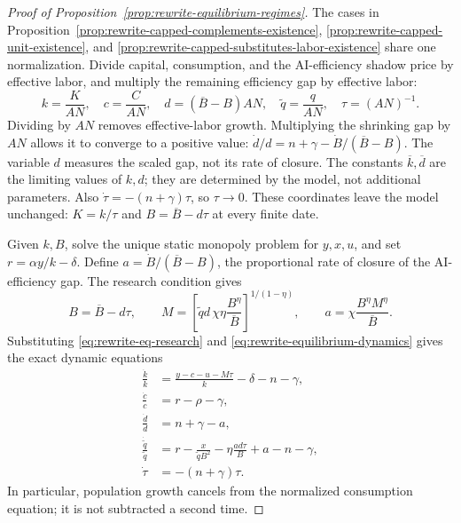 \begin{proof}[Proof of Proposition~\ref{prop:rewrite-equilibrium-regimes}]
The cases in Proposition~\ref{prop:rewrite-capped-complements-existence},
\ref{prop:rewrite-capped-unit-existence}, and
\ref{prop:rewrite-capped-substitutes-labor-existence} share one
normalization. Divide capital, consumption, and the AI-efficiency shadow
price by effective labor, and multiply the remaining efficiency gap by
effective labor:
\begin{equation}
 k=\frac K{AN},\quad c=\frac C{AN},\quad
 d=(\overline B-B)AN,\quad \widetilde q=\frac q{AN},
 \quad \tau=(AN)^{-1}.
 \label{eq:rewrite-labor-proof-coordinates}
\end{equation}
Dividing by $AN$ removes effective-labor growth. Multiplying the shrinking
gap by $AN$ allows it to converge to a positive value:
$\dot d/d=n+\gamma-\dot B/(\overline B-B)$.
The variable $d$ measures the scaled gap, not its rate of closure.
The constants $\overline k,\overline d$ are the limiting values of $k,d$;
they are determined by the model, not additional parameters.
Also $\dot\tau=-(n+\gamma)\tau$, so $\tau\to0$.
These coordinates leave the model unchanged: $K=k/\tau$ and
$B=\overline B-d\tau$ at every finite date.

Given $k,B$, solve the unique static monopoly
problem for $y,x,u$, and set $r=\alpha y/k-\delta$.
Define $a=\dot B/(\overline B-B)$, the proportional rate of closure of the
AI-efficiency gap. The research condition gives
\[
 B=\overline B-d\tau,\qquad
 M=\left[\widetilde qd\,\chi\eta\frac{B^\eta}{\overline B}
       \right]^{1/(1-\eta)},\qquad
 a=\chi\frac{B^\eta M^\eta}{\overline B}.
\]
Substituting \eqref{eq:rewrite-eq-research} and
\eqref{eq:rewrite-equilibrium-dynamics} gives the exact dynamic equations
\begin{subequations}
\label{eq:rewrite-labor-proof-dynamics}
\begin{align}
 \frac{\dot k}{k}&=\frac{y-c-u-M\tau}{k}-\delta-n-\gamma,\\
 \frac{\dot c}{c}&=r-\rho-\gamma,\\
 \frac{\dot d}{d}&=n+\gamma-a,\\
 \frac{\dot{\widetilde q}}{\widetilde q}
 &=r-\frac{x}{\widetilde qB^2}
   -\eta\frac{ad\tau}{B}+a-n-\gamma,\\
 \dot\tau&=-(n+\gamma)\tau.
\end{align}
\end{subequations}
In particular, population growth cancels from the normalized consumption
equation; it is not subtracted a second time.


\end{proof}

